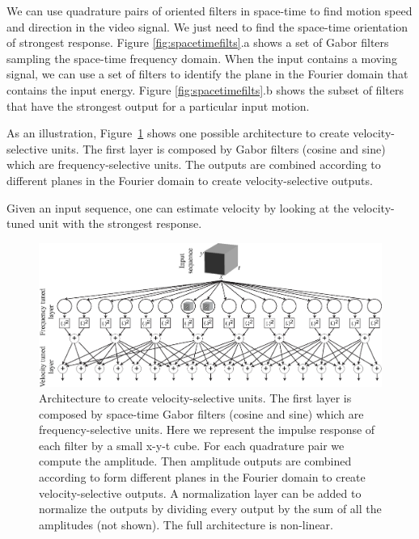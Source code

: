 We can use quadrature pairs of oriented filters in space-time to find motion
speed and direction in the video signal.  We just need to find the
space-time orientation of strongest response. Figure \ref{fig:spacetimefilts}.a shows a set of Gabor filters sampling the space-time frequency domain. When the input contains a moving signal, we can use a set of filters to identify the plane in the Fourier domain that contains the input energy. Figure \ref{fig:spacetimefilts}.b shows the subset of filters that have the strongest output for a particular input motion.


As an illustration, Figure~\ref{fig:MT_velocity_tuned} shows one possible architecture to create velocity-selective units. The first layer is composed by Gabor filters (cosine and sine) which are frequency-selective units. The outputs are combined according to different planes in the Fourier domain to create velocity-selective outputs.

Given an input sequence, one can estimate velocity by looking at the velocity-tuned unit with the strongest response.

\begin{figure}
    \centerline{
        \includegraphics[width=1\linewidth]{figures/temporal_filters/MT_velocity_tuned.eps}
    }
    \caption{Architecture to create velocity-selective units. The first layer is composed by space-time Gabor filters (cosine and sine) which are frequency-selective units. Here we represent the impulse response of each filter by a small x-y-t cube. For each quadrature pair we compute the amplitude. Then amplitude outputs are combined according to form different planes in the Fourier domain to create velocity-selective outputs. A normalization layer can be added to normalize the outputs by dividing every output by the sum of all the amplitudes (not shown). The full architecture is non-linear.}
    \label{fig:MT_velocity_tuned}
\end{figure}

